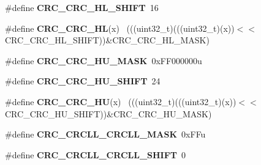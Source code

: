 \begin{DoxyCompactItemize}
\item 
\hypertarget{group___c_r_c___register___masks_ga48dd9ee135e23cc28dfb3574ec525161}{}\#define {\bfseries C\+R\+C\+\_\+\+C\+R\+C\+\_\+\+H\+L\+\_\+\+S\+H\+I\+F\+T}~16\label{group___c_r_c___register___masks_ga48dd9ee135e23cc28dfb3574ec525161}

\item 
\hypertarget{group___c_r_c___register___masks_ga2a85a4bfea71cb8ddea4102adf856f21}{}\#define {\bfseries C\+R\+C\+\_\+\+C\+R\+C\+\_\+\+H\+L}(x)                                                    ~(((uint32\+\_\+t)(((uint32\+\_\+t)(x))$<$$<$C\+R\+C\+\_\+\+C\+R\+C\+\_\+\+H\+L\+\_\+\+S\+H\+I\+F\+T))\&C\+R\+C\+\_\+\+C\+R\+C\+\_\+\+H\+L\+\_\+\+M\+A\+S\+K)\label{group___c_r_c___register___masks_ga2a85a4bfea71cb8ddea4102adf856f21}

\item 
\hypertarget{group___c_r_c___register___masks_gadebf00a86844fdfa04e5d0294b63ac2d}{}\#define {\bfseries C\+R\+C\+\_\+\+C\+R\+C\+\_\+\+H\+U\+\_\+\+M\+A\+S\+K}~0x\+F\+F000000u\label{group___c_r_c___register___masks_gadebf00a86844fdfa04e5d0294b63ac2d}

\item 
\hypertarget{group___c_r_c___register___masks_ga5d9a6f28d57145c1b989afb94ceace63}{}\#define {\bfseries C\+R\+C\+\_\+\+C\+R\+C\+\_\+\+H\+U\+\_\+\+S\+H\+I\+F\+T}~24\label{group___c_r_c___register___masks_ga5d9a6f28d57145c1b989afb94ceace63}

\item 
\hypertarget{group___c_r_c___register___masks_ga76e17f81fb30f319a1a550dd1b315c0d}{}\#define {\bfseries C\+R\+C\+\_\+\+C\+R\+C\+\_\+\+H\+U}(x)                                                    ~(((uint32\+\_\+t)(((uint32\+\_\+t)(x))$<$$<$C\+R\+C\+\_\+\+C\+R\+C\+\_\+\+H\+U\+\_\+\+S\+H\+I\+F\+T))\&C\+R\+C\+\_\+\+C\+R\+C\+\_\+\+H\+U\+\_\+\+M\+A\+S\+K)\label{group___c_r_c___register___masks_ga76e17f81fb30f319a1a550dd1b315c0d}

\item 
\hypertarget{group___c_r_c___register___masks_ga18c915c75953ef8fc41ed89062d62d64}{}\#define {\bfseries C\+R\+C\+\_\+\+C\+R\+C\+L\+L\+\_\+\+C\+R\+C\+L\+L\+\_\+\+M\+A\+S\+K}~0x\+F\+Fu\label{group___c_r_c___register___masks_ga18c915c75953ef8fc41ed89062d62d64}

\item 
\hypertarget{group___c_r_c___register___masks_ga06b93610ab126fe3ae564a62eed6413c}{}\#define {\bfseries C\+R\+C\+\_\+\+C\+R\+C\+L\+L\+\_\+\+C\+R\+C\+L\+L\+\_\+\+S\+H\+I\+F\+T}~0\label{group___c_r_c___register___masks_ga06b93610ab126fe3ae564a62eed6413c}


\end{DoxyCompactItemize}
